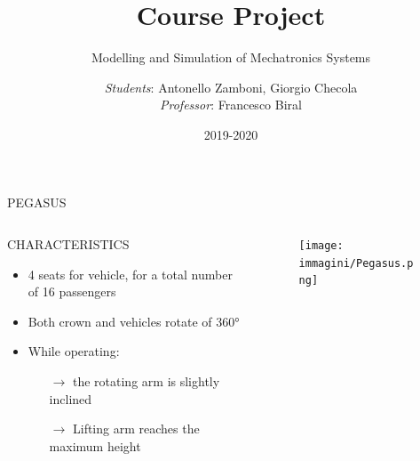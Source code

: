 \documentclass{beamer}              %
\title{Course Project}
\subtitle{Modelling and Simulation of Mechatronics Systems}
\author{\emph{Students}: Antonello Zamboni, Giorgio Checola\\ \emph{Professor}: Francesco Biral }
\institute{Università degli Studi di Trento}
\date{2019-2020}
\begin{document}
	\begin{frame}%
		\titlepage %
	\end{frame}
	\logo{}%


	\begin{frame}{PEGASUS}
		\begin{columns}
			\begin{column}{0.55\textwidth}			
				\begin{block}{\centering \small CHARACTERISTICS}
					
					\medskip
					
					\begin{itemize}
						\item 4 seats for vehicle, for a total number of 16 passengers
						\item Both crown and vehicles rotate of 360°
						\item While operating:
						\begin{itemize}
							\item[$\rightarrow$] the rotating arm is slightly inclined
							\item[$\rightarrow$] Lifting arm reaches the maximum height
						\end{itemize}			
					\end{itemize}
				\end{block}
			\end{column}
			\begin{column}{0.5\textwidth}
				\begin{figure}
					\texttt{[image: immagini/Pegasus.png]}
					\label{Pegasus}
				\end{figure}		    
			\end{column}
		\end{columns}	    
	\end{frame}
\end{document}
